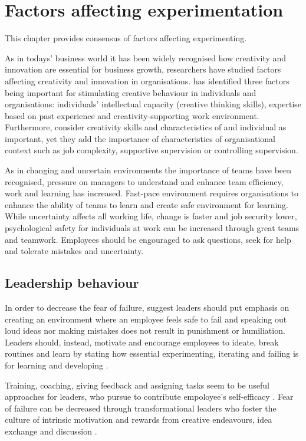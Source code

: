 \chapter{Factors affecting experimentation}
This chapter provides consensus of factors affecting experimenting. 


As in todays' business world it has been widely recognised how creativity and innovation are essential for business growth, researchers have studied factors affecting creativity and innovation in organisations. \citet{amabile1998kill} has identified three factors being important for stimulating creative behaviour in individuals and organisations: individuals' intellectual capacity (creative thinking skills), expertise based on past experience and creativity-supporting work environment. Furthermore, \citet{oldham1996employee} consider creativity skills and characteristics of and individual as important, yet they add the importance of characteristics of organisational context such as job complexity, supportive supervision or controlling supervision. 

As in changing and uncertain environments the importance of teams have been recognised, pressure on managers to understand and enhance team efficiency, work and learning has increased. Fast-pace environment requires organisations to enhance the ability of teams to learn and create safe environment for learning. While uncertainty affects all working life, change is faster and job security lower, psychological safety for individuals at work can be increased through great teams and teamwork. Employees should be engouraged to ask questions, seek for help and tolerate mistakes and uncertainty. \citep{edmondson1999psychological}

\section{Leadership behaviour}

In order to decrease the fear of failure, \citet{amabile2008creativity} suggest leaders should put emphasis on creating an environment where an employee feels safe to fail and speaking out loud ideas nor making mistakes does not result in punishment or humiliation. Leaders should, instead, motivate and encourage employees to ideate, break routines and learn by stating how essential experimenting, iterating and failing is for learning and developing \citep{amabile2008creativity,shalley2004leaders}.

Training, coaching, giving feedback and assigning tasks seem to be useful approaches for leaders, who pursue to contribute empoloyee's self-efficacy \citep{amabile1998kill}. Fear of failure can be decreased through transformational leaders who foster the culture of intrinsic motivation and rewards from creative endeavours, idea exchange and discussion \citep{amabile1998kill}.

